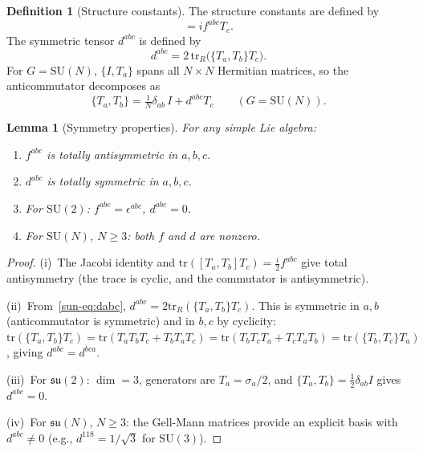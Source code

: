 \documentclass[11pt]{article}
\newtheorem{lemma}[theorem]{Lemma}
\theoremstyle{definition}
\newtheorem{definition}[theorem]{Definition}
\newcommand{\SU}{\mathrm{SU}}
\newcommand{\su}{\mathfrak{su}}
\newcommand{\tr}{\mathrm{tr}}
\begin{document}
\begin{definition}[Structure constants]\label{sun-def:structure}
The structure constants are defined by
\begin{equation}
[T_a,T_b]=if^{abc}T_c.\label{sun-eq:commutator}
\end{equation}
The symmetric tensor $d^{abc}$ is defined by
\begin{equation}\label{sun-eq:dabc}
d^{abc}=2\,\tr_R\bigl(\{T_a,T_b\}T_c\bigr).
\end{equation}
For $G=\SU(N)$, $\{I,T_a\}$ spans all
$N\times N$ Hermitian matrices, so the
anticommutator decomposes as
\begin{equation}\label{sun-eq:anticommutator}
\{T_a,T_b\}=\tfrac{1}{N}\delta_{ab}\,I
+d^{abc}T_c\qquad(G=\SU(N)).
\end{equation}
\end{definition}

\begin{lemma}[Symmetry properties]
\label{sun-lem:symmetry}
For any simple Lie algebra:
\begin{enumerate}[nosep,label=(\roman*)]
\item $f^{abc}$ is totally antisymmetric in $a,b,c$.
\item $d^{abc}$ is totally symmetric in $a,b,c$.
\item For $\SU(2)$: $f^{abc}=\epsilon^{abc}$,
$d^{abc}=0$.
\item For $\SU(N)$, $N\ge 3$: both $f$ and $d$ are
nonzero.
\end{enumerate}
\end{lemma}

\begin{proof}
(i)~The Jacobi identity and
$\tr([T_a,T_b]T_c)=\frac{i}{2}f^{abc}$ give total
antisymmetry (the trace is cyclic, and the commutator is
antisymmetric).

(ii)~From~\eqref{sun-eq:dabc},
$d^{abc}=2\tr_R(\{T_a,T_b\}T_c)$.  This is symmetric
in $a,b$ (anticommutator is symmetric) and in $b,c$
by cyclicity: $\tr(\{T_a,T_b\}T_c)
=\tr(T_a T_b T_c+T_b T_a T_c)
=\tr(T_b T_c T_a+T_c T_a T_b)
=\tr(\{T_b,T_c\}T_a)$, giving
$d^{abc}=d^{bca}$.

(iii)~For $\su(2)$: $\dim=3$, generators are
$T_a=\sigma_a/2$, and $\{T_a,T_b\}=\frac{1}{2}\delta_{ab}I$
gives $d^{abc}=0$.

(iv)~For $\su(N)$, $N\ge 3$: the Gell-Mann matrices
provide an explicit basis with $d^{abc}\ne 0$
(e.g., $d^{118}=1/\sqrt{3}$ for $\SU(3)$).
\end{proof}
\end{document}
